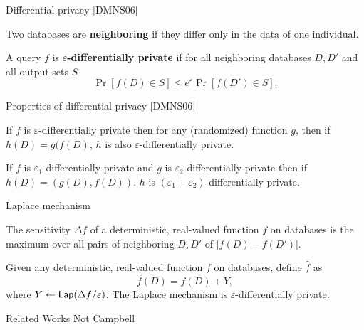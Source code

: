\documentclass{beamer}
\newcommand{\lap}{\ensuremath{{\sf Lap}}\xspace}
\begin{document}
\begin{frame}{Differential privacy [DMNS06]}

\begin{definition}
Two databases are \textbf{neighboring} if they differ only in the data of one individual.
\end{definition}
\pause
\begin{definition}
A query $f$ is \textbf{$\varepsilon$-differentially private} if for all neighboring databases $D, D'$ and all output sets $S$
\begin{equation*}
\Pr[f(D) \in S] \leq e^\varepsilon \Pr[f(D') \in S].
\end{equation*}
\end{definition}
\end{frame}

\begin{frame}{Properties of differential privacy [DMNS06]}
\begin{theorem}
If $f$ is $\varepsilon$-differentially private then for any (randomized) function $g$, then if $h(D) = g(f(D)$, $h$ is also $\varepsilon$-differentially private.
\end{theorem}
\pause
\begin{theorem}[Composition]
If $f$ is $\varepsilon_1$-differentially private and $g$ is $\varepsilon_2$-differentially private then if $h(D) = (g(D), f(D))$, $h$ is  $(\varepsilon_1+\varepsilon_2)$-differentially private.
\end{theorem}
\end{frame}

\begin{frame}{Laplace mechanism}
\begin{definition}[Sensitivity]
The sensitivity $\Delta f$ of a deterministic, real-valued function $f$ on databases is the maximum over all pairs of neighboring $D, D'$ of $| f(D) - f(D') |$.
\end{definition}

\pause
\begin{theorem}
Given any deterministic, real-valued function $f$ on databases, define $\widehat{f}$ as
$$\widehat{f}(D) = f(D) + Y,$$
where $Y \leftarrow \lap(\Delta f/\varepsilon)$. The Laplace mechanism is $\varepsilon$-differentially private.
\end{theorem}
\end{frame}

\begin{frame}{Related Works}
    Not Campbell
\end{frame}
\end{document}
